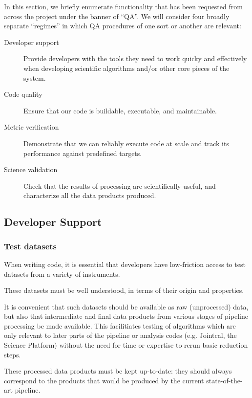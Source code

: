 \documentclass[DM,authoryear,toc,lsstdraft]{lsstdoc}
\begin{document}
In this section, we briefly enumerate functionality that has been requested
from across the project under the banner of ``QA''.  We will consider four
broadly separate ``regimes'' in which QA procedures of one sort or another are
relevant:

\begin{description}

\item[Developer support]{Provide developers with the tools they need to work
quicky and effectively when developing scientific algorithms and/or other core
pieces of the system.}

\item[Code quality]{Ensure that our code is buildable, executable, and
maintainable.}

\item[Metric verification]{Demonstrate that we can reliably execute code at
scale and track its performance against predefined targets.}

\item[Science validation]{Check that the results of processing are
scientifically useful, and characterize all the data products produced.}

\end{description}

\subsection{Developer Support}

\subsubsection{Test datasets}

When writing code, it is essential that developers have low-friction access to
test datasets from a variety of instruments.

These datasets must be well understood, in terms of their origin and
properties.

It is convenient that such datasets should be available as raw (unprocessed)
data, but also that intermediate and final data products from various stages
of pipeline processing be made available. This facilitiates testing of
algorithms which are only relevant to later parts of the pipeline or analysis
codes (e.g. Jointcal, the Science Platform) without the need for time or
expertise to rerun basic reduction steps.

These processed data products must be kept up-to-date: they should always
correspond to the products that would be produced by the current
state-of-the-art pipeline.
\end{document}
